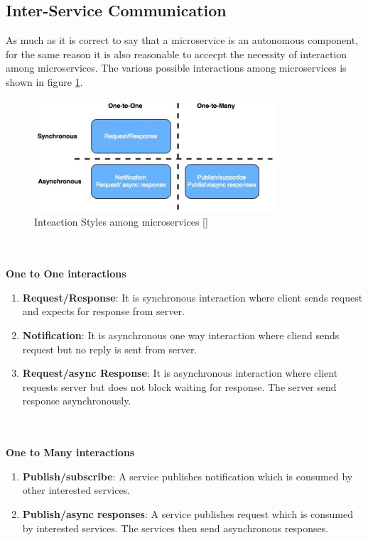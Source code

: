 \subsection{Inter-Service Communication}\label{section:challanges_of_microservices_architecture/integration/inter_service_communication}
As much as it is correct to say that a microservice is an autonomous component, for the same reason it is also reasonable to accecpt the necessity of interaction among microservices. The various possible interactions among microservices is shown in figure \ref{fig:challanges_of_microservices_architecture/integration/inter_service_communication/interaction_styles_among_microservices}.\cite{Richardson:2015ab}
\begin{figure}[H]
\begin{center}
\includegraphics[width=0.8\textwidth]{figures/challenges_one_interaction_styles}
\caption{Inteaction Styles among microservices [\cite{Richardson:2015ab}]}
\label{fig:challanges_of_microservices_architecture/integration/inter_service_communication/interaction_styles_among_microservices}
\end{center}
\end{figure}
\\
\\
\textbf{One to One interactions}
\\
\begin{enumerate}
\item \textbf{Request/Response}: It is synchronous interaction where client sends request and expects for response from server.
\item \textbf{Notification}: It is asynchronous one way interaction where cliend sends request but no reply is sent from server.
\item \textbf{Request/async Response}: It is asynchronous interaction where client requests server but does not block waiting for response. The server send response asynchronously.
\end{enumerate}
\\
\\
\textbf{One to Many interactions}
\\
\begin{enumerate}
\item \textbf{Publish/subscribe}: A service publishes notification which is consumed by other interested services.
\item \textbf{Publish/async responses}: A service publishes request which is consumed by interested services. The services then send asynchronous responses.
\end{enumerate}
\\
\\


